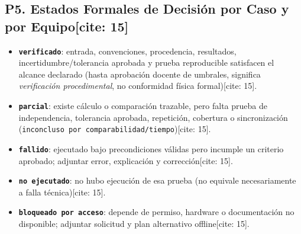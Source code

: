 \documentclass[10pt, a4paper]{article}
\begin{document}
\subsection*{P5. Estados Formales de Decisión por Caso y por Equipo[cite: 15]}
\begin{itemize}\footnotesize
    \item \textbf{\texttt{verificado}}: entrada, convenciones, procedencia, resultados, incertidumbre/tolerancia aprobada y prueba reproducible satisfacen el alcance declarado (hasta aprobación docente de umbrales, significa \textit{verificación procedimental}, no conformidad física formal)[cite: 15].
    \item \textbf{\texttt{parcial}}: existe cálculo o comparación trazable, pero falta prueba de independencia, tolerancia aprobada, repetición, cobertura o sincronización (\texttt{inconcluso por comparabilidad/tiempo})[cite: 15].
    \item \textbf{\texttt{fallido}}: ejecutado bajo precondiciones válidas pero incumple un criterio aprobado; adjuntar error, explicación y corrección[cite: 15].
    \item \textbf{\texttt{no ejecutado}}: no hubo ejecución de esa prueba (no equivale necesariamente a falla técnica)[cite: 15].
    \item \textbf{\texttt{bloqueado por acceso}}: depende de permiso, hardware o documentación no disponible; adjuntar solicitud y plan alternativo offline[cite: 15].
\end{itemize}
\end{document}
